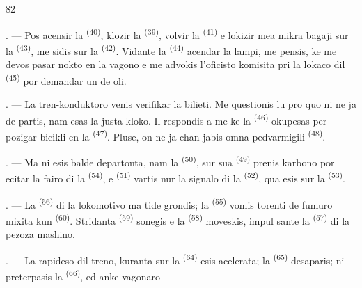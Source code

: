\begin{VUpage}[84]{82}
\VUsaut{3.0mm}

. --- Pos acensir la  \textsuperscript{(40)}, klozir\nl
la  \textsuperscript{(39)}, volvir la  \textsuperscript{(41)} e lokizir mea\nl
mikra bagaji sur la  \textsuperscript{(43)}, me sidis sur la\nl
{} \textsuperscript{(42)}. Vidante la  \textsuperscript{(44)} acendar la\nl
lampi, me pensis, ke me devos pasar nokto en\nl
la vagono e me advokis l'oficisto komisita pri\nl
la lokaco dil  \textsuperscript{(45)} por demandar un\nl
de oli.

. --- La tren-konduktoro venis verifikar la\nl
bilieti. Me questionis lu pro quo ni ne ja de\cc
partis, nam esas la justa kloko. Il respondis\nl
a me ke la  \textsuperscript{(46)} okupesas per pozigar\nl
bicikli en la  \textsuperscript{(47)}. Pluse, on ne ja chan\cc
jabis omna pedvarmigili \textsuperscript{(48)}.

. --- Ma ni esis balde departonta, nam la\nl
{} \textsuperscript{(50)}, sur sua  \textsuperscript{(49)} prenis karbono\nl
por ecitar la fairo di la  \textsuperscript{(54)}, e\nl
{} \textsuperscript{(51)} vartis nur la signalo di la\nl
{} \textsuperscript{(52)}, qua esis sur la \cc
{} \textsuperscript{(53)}.

. --- La  \textsuperscript{(56)} di la lokomotivo ma\cc
tide grondis; la  \textsuperscript{(55)} vomis torenti de\nl
fumuro mixita kun  \textsuperscript{(60)}. Stridanta \cc
{} \textsuperscript{(59)} sonegis e la  \textsuperscript{(58)} moveskis, impul\cc
sante la  \textsuperscript{(57)} di la pezoza mashino.

\VUsaut{3.0mm}
\VUsaut{3.0mm}

. --- La rapideso dil treno, kuranta sur la\nl
{} \textsuperscript{(64)} esis acelerata; la  \textsuperscript{(65)} desaparis;\nl
ni preterpasis la  \textsuperscript{(66)}, ed anke vagonaro
\parplein
\end{VUpage}

